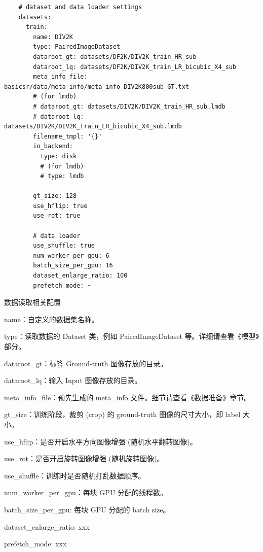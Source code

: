 \documentclass[../main.tex]{subfiles}
\begin{document}
    \begin{verbatim}
    # dataset and data loader settings
    datasets:
      train:
        name: DIV2K
        type: PairedImageDataset
        dataroot_gt: datasets/DF2K/DIV2K_train_HR_sub
        dataroot_lq: datasets/DF2K/DIV2K_train_LR_bicubic_X4_sub
        meta_info_file: basicsr/data/meta_info/meta_info_DIV2K800sub_GT.txt
        # (for lmdb)
        # dataroot_gt: datasets/DIV2K/DIV2K_train_HR_sub.lmdb
        # dataroot_lq: datasets/DIV2K/DIV2K_train_LR_bicubic_X4_sub.lmdb
        filename_tmpl: '{}'
        io_backend:
          type: disk
          # (for lmdb)
          # type: lmdb

        gt_size: 128
        use_hflip: true
        use_rot: true

        # data loader
        use_shuffle: true
        num_worker_per_gpu: 6
        batch_size_per_gpu: 16
        dataset_enlarge_ratio: 100
        prefetch_mode: ~
    \end{verbatim}
    \begin{exampleBox}[righthand ratio=0.00, sidebyside, sidebyside align=center, lower separated=false]{数据读取相关配置}

    name：自定义的数据集名称。

    type：读取数据的 Dataset 类，例如 PairedImageDataset 等。详细请查看《模型》部分。

    dataroot\_gt：标签 Ground-truth 图像存放的目录。

    dataroot\_lq：输入 Input 图像存放的目录。

    meta\_info\_file：预先生成的 meta\_info 文件。细节请查看《数据准备》章节。

    gt\_size：训练阶段，裁剪 (crop) 的 ground-truth 图像的尺寸大小，即 label 大小。

    use\_hflip：是否开启水平方向图像增强 (随机水平翻转图像)。

    use\_rot：是否开启旋转图像增强 (随机旋转图像)。

    use\_shuffle：训练时是否随机打乱数据顺序。

    num\_worker\_per\_gpu：每块 GPU 分配的线程数。

    batch\_size\_per\_gpu: 每块 GPU 分配的 batch size。

    dataset\_enlarge\_ratio: xxx

    prefetch\_mode: xxx

    \end{exampleBox}
\end{document}
